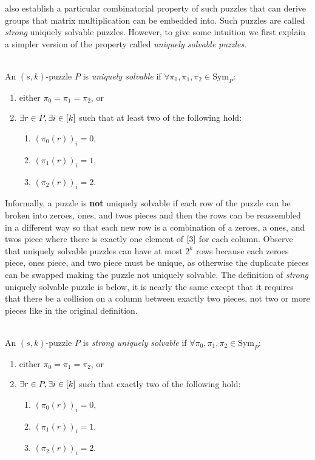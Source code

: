 \documentclass[11pt]{article}
\newcommand\Sym[1]{\ensuremath{\mathrm{Sym}_{#1}}}
\begin{document}
\cite{cksu05} also establish a particular combinatorial property of
such puzzles that can derive groups that matrix multiplication can be
embedded into.  Such puzzles are called \emph{strong} uniquely
solvable puzzles.  However, to give some intuition we first explain a
simpler version of the property called \emph{uniquely solvable
  puzzles}.

\begin{definition}
  \label{def:strong-USP}
  ~\\An $(s,k)$-puzzle $P$ is \emph{uniquely solvable} if
  $\forall \pi_0, \pi_1, \pi_2 \in \Sym{P}:$
  \begin{enumerate}
  \item either $\pi_0 = \pi_1 = \pi_2$, or
  \item $\exists r \in P, \exists i \in [k]$ such that at least two
    of the following hold:
    \begin{enumerate}
    \item $(\pi_0(r))_i = 0$,
    \item $(\pi_1(r))_i = 1$,
    \item $(\pi_2(r))_i = 2$.
    \end{enumerate}
  \end{enumerate}
\end{definition}

Informally, a puzzle is \textbf{not} uniquely solvable if each row of
the puzzle can be broken into zeroes, ones, and twos pieces and then
the rows can be reassembled in a different way so that each new row is
a combination of a zeroes, a ones, and twos piece where there is
exactly one element of $[3]$ for each column.  Observe that
uniquely solvable puzzles can have at most $2^k$ rows because each
zeroes piece, ones piece, and two piece must be unique, as otherwise
the duplicate pieces can be swapped making the puzzle not uniquely
solvable.  The definition of \emph{strong} uniquely solvable puzzle is
below, it is nearly the same except that it requires that there be a
collision on a column between exactly two pieces, not two or more
pieces like in the original definition.

\begin{definition}
  ~\\
  An $(s,k)$-puzzle $P$ is \emph{strong uniquely solvable} if
  $\forall \pi_0, \pi_1, \pi_2 \in \Sym{P}:$
  \begin{enumerate}
  \item either $\pi_0 = \pi_1 = \pi_2$, or
  \item $\exists r \in P, \exists i \in [k]$ such that exactly two
    of the following hold:
    \begin{enumerate}
    \item $(\pi_0(r))_i = 0$,
    \item $(\pi_1(r))_i = 1$,
    \item $(\pi_2(r))_i = 2$.
    \end{enumerate}
  \end{enumerate}

\end{definition}
\end{document}
